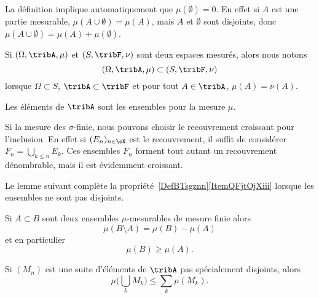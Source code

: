 \begin{remark}
    La définition implique automatiquement que \( \mu(\emptyset)=0\). En effet si \( A\) est une partie mesurable, \( \mu(A\cup \emptyset)=\mu(A)\), mais \( A\) et \( \emptyset\) sont disjoints, donc \( \mu(A\cup \emptyset)=\mu(A)+\mu(\emptyset)\).
\end{remark}

Si \( (\Omega,\tribA,\mu)\) et \( (S,\tribF,\nu)\) sont deux espaces mesurés, alors nous notons
\begin{equation}
    (\Omega,\tribA,\mu)\subset (S,\tribF,\nu)
\end{equation}
lorsque \( \Omega\subset S\), \( \tribA\subset\tribF\) et pour tout \( A\in\tribA\), \( \mu(A)=\nu(A)\).

\begin{definition}\label{DefHGsQxHB}
    Les éléments de \( \tribA\) sont les ensembles  pour la mesure \( \mu\).
\end{definition}

Si la mesure des \( \sigma\)-finie, nous pouvons choisir le recouvrement croissant pour l'inclusion. En effet si \( (E_n)_{n\in \eN}\) est le recouvrement, il suffit de considérer \( F_n=\bigcup_{k\leq n}E_k\). Ces ensembles \( F_n\) forment tout autant un recouvrement dénombrable, mais il est évidemment croissant.

Le lemme suivant complète la propriété~\ref{DefBTsgznn}\ref{ItemQFjtOjXiii} lorsque les ensembles ne sont pas disjoints.
\begin{lemma} \label{LemPMprYuC}
    Si \( A\subset B\) sont deux ensembles \( \mu\)-mesurables de mesure finie alors
    \begin{equation}
        \mu(B\setminus A)=\mu(B)-\mu(A)
    \end{equation}
    et en particulier
    \begin{equation}
        \mu(B)\geq \mu(A).
    \end{equation}

    Si \( (M_n)\) est une suite d'éléments de \( \tribA\) pas spécialement disjoints, alors
    \begin{equation}\label{EqWWFooYPCTt}
        \mu\big( \bigcup_kM_k \big)\leq \sum_{k}\mu(M_k).
    \end{equation}
\end{lemma}

